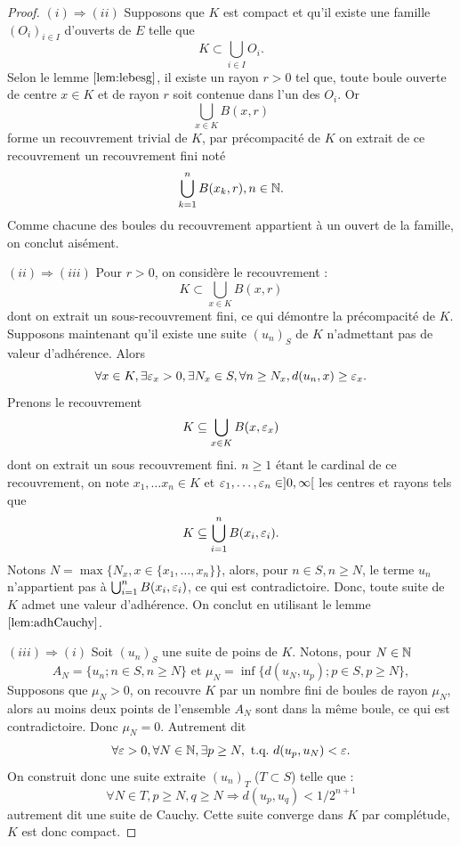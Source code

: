 \begin{proof}
$(i) \Rightarrow (ii)$ Supposons que $K$ est compact et qu'il existe une famille $(O_i)_{i \in I}$ d'ouverts de $E$ telle que 
\[ K \subset \bigcup_{i \in I} O_i . \]
Selon le lemme $\ref{lem:lebesg}$, il existe un rayon $r>0$ tel que, 
toute boule ouverte de centre $x \in K$ et de rayon $r$ soit contenue dans l'un des $O_i$. Or
\[ \bigcup_{x \in K} B(x, r) \]
forme un recouvrement trivial de $K$, par précompacité de $K$ on extrait de ce recouvrement un recouvrement fini noté 
\[ \bigcup_{k=1}^n B(x_k, r), n \in \mathbb{N} . \]
Comme chacune des boules du recouvrement appartient à un ouvert de la famille, on conclut aisément. \newline

$(ii) \Rightarrow (iii)$ Pour $r>0$, on considère le recouvrement :
\[ K \subset \bigcup_{x \in K} B(x,r) \]
dont on extrait un sous-recouvrement fini, ce qui démontre la précompacité de $K$. 
Supposons maintenant qu'il existe une suite $(u_n)_S$ de $K$ n'admettant pas de valeur d'adhérence. Alors
\[ \forall x \in K, \exists \varepsilon_x >0, \exists N_x \in S, \forall n \geq N_x, d(u_n, x) \geq \varepsilon_x . \]
Prenons le recouvrement 
\[ K \subseteq \bigcup_{x \in K} B(x, \varepsilon_x) \]
dont on extrait un sous recouvrement fini. $n \geq 1$ étant le cardinal de ce recouvrement, on note
 $x_1, \dots x_n \in K$ et $\varepsilon_1, \dots,\varepsilon_n \in ]0, \infty[$ les centres et rayons tels que 
\[ K \subseteq \bigcup_{i =1}^n B(x_i, \varepsilon_i) . \]
Notons $N = \max \{ N_x, x \in \{x_1, \dots, x_n \} \}$, alors, pour $n \in S, n \geq N$, 
le terme $u_n$ n'appartient pas à $\bigcup_{i =1}^n B(x_i, \varepsilon_i)$, ce qui est contradictoire. 
Donc, toute suite de $K$ admet une valeur d'adhérence. 
On conclut en utilisant le lemme $\ref{lem:adhCauchy}$. \newline

$(iii) \Rightarrow (i)$ Soit $(u_n)_S$ une suite de poins de $K$. Notons, pour $N \in \mathbb{N}$
\[ A_N = \{u_n ; n \in S, n \geq N \} \text{ et } \mu_N = \inf \{ d(u_N, u_p) ; p \in S, p \geq N \} ,\]
Supposons que $\mu_N >0$, on recouvre $K$ par un nombre fini de boules de rayon $\mu_N$, 
alors au moins deux points de l'ensemble $A_N$ sont dans la même boule, ce qui est contradictoire. 
Donc $\mu_N=0$. Autrement dit
\[ \forall \varepsilon > 0, \forall N \in \mathbb{N}, \exists p \geq N, \text{~t.q.~} d(u_p, u_N) < \varepsilon. \]
On construit donc une suite extraite $(u_n)_T$ ($T \subset S$) telle que :
\[ \forall N \in T, p \geq N, q \geq N  \Rightarrow d(u_p, u_q) < 1/2^{n+1} \]
autrement dit une suite de Cauchy. Cette suite converge dans $K$ par complétude, $K$ est donc compact.

\end{proof}

